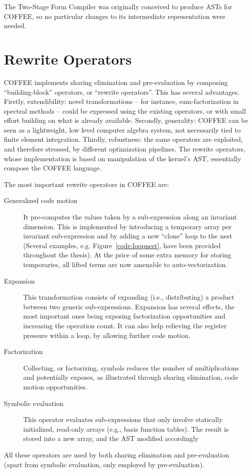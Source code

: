 The Two-Stage Form Compiler was originally conceived to produce ASTs for COFFEE, so no particular changes to its intermediate representation were needed. 


\section{Rewrite Operators}
\label{sec:coffee:rewrite-ops}
COFFEE implements sharing elimination and pre-evaluation by composing ``building-block'' operators, or ``rewrite operators''. This has several advantages. Firstly, extendibility: novel transformations -- for instance, sum-factorization in spectral methods -- could be expressed using the existing operators, or with small effort building on what is already available. Secondly, generality: COFFEE can be seen as a lightweight, low level computer algebra system, not necessarily tied to finite element integration. Thirdly, robustness: the same operators are exploited, and therefore stressed, by different optimization pipelines. The rewrite operators, whose implementation is based on manipulation of the kernel's AST, essentially compose the COFFEE language. 

The most important rewrite operators in COFFEE are:
\begin{description}
\item[Generalized code motion] It pre-computes the values taken by a sub-expression along an invariant dimension. This is implemented by introducing a temporary array per invariant sub-expression and by adding a new ``clone'' loop to the nest (Several examples, e.g. Figure~\ref{code:loopnest}, have been provided throughout the thesis). At the price of some extra memory for storing temporaries, all lifted terms are now amenable to auto-vectorization. 
\item[Expansion] This transformation consists of expanding (i.e., distributing) a product between two generic sub-expressions. Expansion has several effects, the most important ones being exposing factorization opportunities and increasing the operation count. It can also help relieving the register pressure within a loop, by allowing further code motion.
\item[Factorization] Collecting, or factorizing, symbols reduces the number of multiplications and potentially exposes, as illustrated through sharing elimination, code motion opportunities.
\item[Symbolic evaluation] This operator evaluates sub-expressions that only involve statically initialized, read-only arrays (e.g., basis function tables). The result is stored into a new array, and the AST modified accordingly
\end{description}
All these operators are used by both sharing elimination and pre-evaluation (apart from symbolic evaluation, only employed by pre-evaluation).

